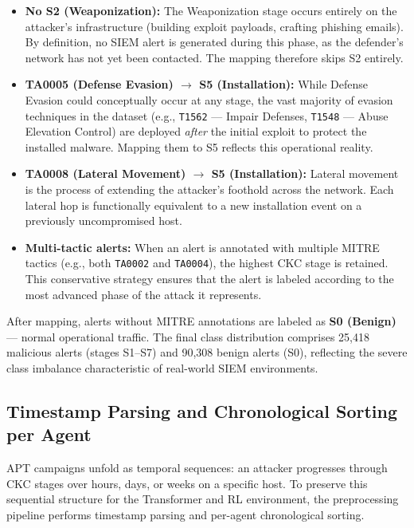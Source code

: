 \begin{itemize}
    \item \textbf{No S2 (Weaponization):} The Weaponization stage occurs entirely on the attacker's infrastructure (building exploit payloads, crafting phishing emails). By definition, no SIEM alert is generated during this phase, as the defender's network has not yet been contacted. The mapping therefore skips S2 entirely.
    \item \textbf{TA0005 (Defense Evasion) $\rightarrow$ S5 (Installation):} While Defense Evasion could conceptually occur at any stage, the vast majority of evasion techniques in the dataset (e.g., \texttt{T1562} --- Impair Defenses, \texttt{T1548} --- Abuse Elevation Control) are deployed \textit{after} the initial exploit to protect the installed malware. Mapping them to S5 reflects this operational reality.
    \item \textbf{TA0008 (Lateral Movement) $\rightarrow$ S5 (Installation):} Lateral movement is the process of extending the attacker's foothold across the network. Each lateral hop is functionally equivalent to a new installation event on a previously uncompromised host.
    \item \textbf{Multi-tactic alerts:} When an alert is annotated with multiple MITRE tactics (e.g., both \texttt{TA0002} and \texttt{TA0004}), the highest CKC stage is retained. This conservative strategy ensures that the alert is labeled according to the most advanced phase of the attack it represents.
\end{itemize}

After mapping, alerts without MITRE annotations are labeled as \textbf{S0 (Benign)} --- normal operational traffic. The final class distribution comprises 25,418 malicious alerts (stages S1--S7) and 90,308 benign alerts (S0), reflecting the severe class imbalance characteristic of real-world SIEM environments.

\subsection{Timestamp Parsing and Chronological Sorting per Agent}
\label{subsec:timestamp_sorting}

APT campaigns unfold as temporal sequences: an attacker progresses through CKC stages over hours, days, or weeks on a specific host. To preserve this sequential structure for the Transformer and RL environment, the preprocessing pipeline performs timestamp parsing and per-agent chronological sorting.

